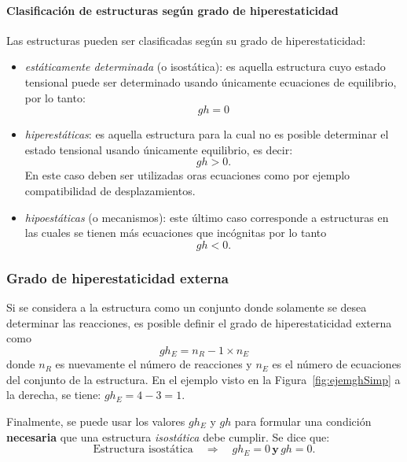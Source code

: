 \paragraph{Clasificación de estructuras según grado de hiperestaticidad} %
Las estructuras pueden ser clasificadas según su grado de hiperestaticidad:
\begin{itemize}
	\item \textit{estáticamente determinada} (o isostática): es aquella estructura cuyo estado tensional puede ser determinado usando únicamente ecuaciones de equilibrio, por lo tanto:
	$$
	gh = 0
	$$
	
	\item \textit{hiperestáticas}: es aquella estructura para la cual no es posible determinar el estado tensional usando únicamente equilibrio, es decir:
	$$
	gh > 0.
	$$
	En este caso deben ser utilizadas oras ecuaciones como por ejemplo compatibilidad de desplazamientos. %
	
	\item \textit{hipoestáticas} (o mecanismos): este último caso corresponde a estructuras en las cuales se tienen más ecuaciones que incógnitas por lo tanto
	$$
	gh <0.
	$$
\end{itemize}



\subsubsection{Grado de hiperestaticidad externa}
%
Si se considera a la estructura como un conjunto donde solamente se desea determinar las reacciones, es posible definir el grado de hiperestaticidad externa como
%
\begin{equation}
gh_E = n_{R} - 1 \times n_{E}
\end{equation}
%
donde $n_R$ es nuevamente el número de reacciones y $n_E$ es el número de ecuaciones del conjunto de la estructura. %
%
En el ejemplo visto en la Figura~\ref{fig:ejemghSimp} a la derecha, se tiene: $gh_E = 4 - 3 = 1$. %



Finalmente, se puede usar los valores $gh_E$ y $gh$ para formular una condición \textbf{necesaria} que una estructura \textit{isostática} debe cumplir. %
%
{\cambio
Se dice que:
%
$$
\boxed{
\text{Estructura isostática} \quad \Rightarrow \quad gh_E = 0 \, \textbf{y} \, gh = 0.
}%
$$
}


